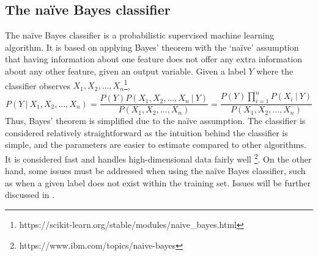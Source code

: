 \subsection{The naïve Bayes classifier\label{subsec:naivebayes-back}}
The naïve Bayes classifier is a probabilistic supervised machine learning algorithm. It is based on applying Bayes' theorem with the `naïve' assumption that having information about one feature does not offer any extra information about any other feature, given an output variable. Given a label $Y$ where the classifier observes $X_{1}, X_{2}, ..., X_{n}$\footnote{https://scikit-learn.org/stable/modules/naive_bayes.html},
\begin{equation*}
P(Y \ | \ X_{1}, X_{2}, ..., X_{n}) = \frac{P(Y)P(X_{1}, X_{2}, ..., X_{n} \ | \ Y)}{P(X_{1}, X_{2}, ..., X_{n})} = \frac{P(Y) \prod_{i=1}^{n} P(X_{i} \ | \ Y)}{P(X_{1}, X_{2}, ..., X_{n})}
\end{equation*}
Thus, Bayes' theorem is simplified due to the naïve assumption. The classifier is considered relatively straightforward as the intuition behind the classifier is simple, and the parameters are easier to estimate compared to other algorithms. It is considered fast and handles high-dimensional data fairly well \footnote{https://www.ibm.com/topics/naive-bayes}. On the other hand, some issues must be addressed when using the naïve Bayes classifier, such as when a given label does not exist within the training set. Issues will be further discussed in .